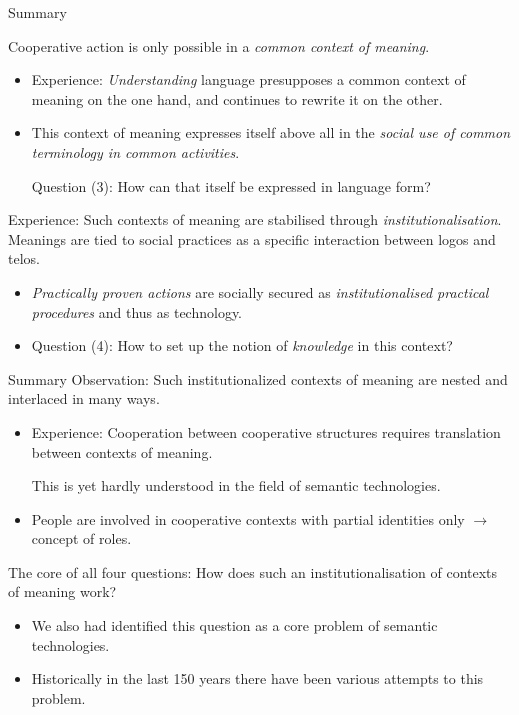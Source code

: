 \documentclass{beamer}
\begin{document}
\begin{frame}{Summary}\small

Cooperative action is only possible in a \emph{common context of meaning}.
\begin{itemize}
\item Experience: \emph{Understanding} language presupposes a common context
  of meaning on the one hand, and continues to rewrite it on the other.
\item This context of meaning expresses itself above all in the \emph{social
  use of common terminology in common activities}.

  Question (3): How can that itself be expressed in language form?
\end{itemize}

Experience: Such contexts of meaning are stabilised through
\emph{institutionalisation}. Meanings are tied to social practices as a
specific interaction between logos and telos.
\begin{itemize}
\item \emph{Practically proven actions} are socially secured as
  \emph{institutionalised practical procedures} and thus as technology.
\item Question (4): How to set up the notion of \emph{knowledge} in this
  context?
\end{itemize}\vspace*{2em}
\end{frame}
\begin{frame}{Summary}\small
Observation: Such institutionalized contexts of meaning are nested and
interlaced in many ways.
\begin{itemize}
\item Experience: Cooperation between cooperative structures requires
  translation between contexts of meaning.

  This is yet hardly understood in the field of semantic technologies.
\item People are involved in cooperative contexts with partial identities only
  $\to$ concept of roles.
\end{itemize}
The core of all four questions: How does such an institutionalisation of
contexts of meaning work?
\begin{itemize}
\item We also had identified this question as a core problem of semantic
  technologies.
\item Historically in the last 150 years there have been various attempts to
  this problem.
\end{itemize}
\end{frame}
\end{document}
